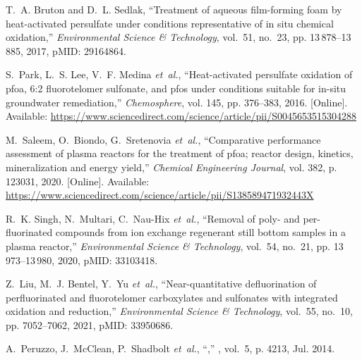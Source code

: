 \documentclass[journal,onecolumn]{IEEEtran}
\begin{document}
\begin{thebibliography}{48}
T.~A. Bruton and D.~L. Sedlak, ``Treatment of aqueous film-forming foam by
  heat-activated persulfate under conditions representative of in situ chemical
  oxidation,'' \emph{Environmental Science \& Technology}, vol.~51, no.~23, pp.
  13\,878--13\,885, 2017, pMID: 29164864.

\BIBentryALTinterwordspacing
S.~Park, L.~S. Lee, V.~F. Medina \emph{et~al.}, ``Heat-activated persulfate
  oxidation of pfoa, 6:2 fluorotelomer sulfonate, and pfos under conditions
  suitable for in-situ groundwater remediation,'' \emph{Chemosphere}, vol. 145,
  pp. 376--383, 2016. [Online]. Available:
  \url{https://www.sciencedirect.com/science/article/pii/S0045653515304288}
\BIBentrySTDinterwordspacing

\BIBentryALTinterwordspacing
M.~Saleem, O.~Biondo, G.~Sretenovia \emph{et~al.}, ``Comparative performance
  assessment of plasma reactors for the treatment of pfoa; reactor design,
  kinetics, mineralization and energy yield,'' \emph{Chemical Engineering
  Journal}, vol. 382, p. 123031, 2020. [Online]. Available:
  \url{https://www.sciencedirect.com/science/article/pii/S138589471932443X}
\BIBentrySTDinterwordspacing

R.~K. Singh, N.~Multari, C.~Nau-Hix \emph{et~al.}, ``Removal of poly- and
  per-fluorinated compounds from ion exchange regenerant still bottom samples
  in a plasma reactor,'' \emph{Environmental Science \& Technology}, vol.~54,
  no.~21, pp. 13\,973--13\,980, 2020, pMID: 33103418.

Z.~Liu, M.~J. Bentel, Y.~Yu \emph{et~al.}, ``Near-quantitative defluorination
  of perfluorinated and fluorotelomer carboxylates and sulfonates with
  integrated oxidation and reduction,'' \emph{Environmental Science \&
  Technology}, vol.~55, no.~10, pp. 7052--7062, 2021, pMID: 33950686.

A.~Peruzzo, J.~McClean, P.~Shadbolt \emph{et~al.}, ``,''
  \emph{}, vol.~5, p. 4213, Jul. 2014.


\end{thebibliography}
\end{document}
